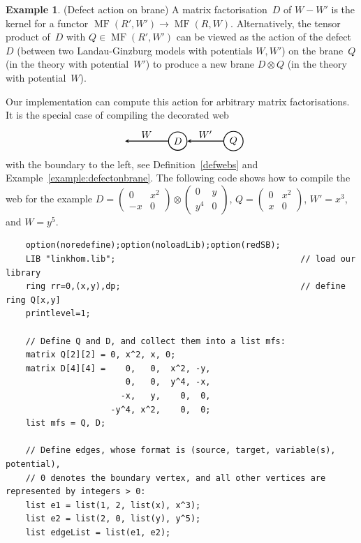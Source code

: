 \documentclass{compositio}
\theoremstyle{definition}
\newtheorem{example}[theorem]{Example}
\numberwithin{equation}{section}
\DeclareMathOperator{\MF}{MF}
\begin{document}
\begin{example}(Defect action on brane) 
A matrix factorisation~$D$ of $W-W'$ is the kernel for a functor $\MF(R',W')\longrightarrow \MF(R,W)$. Alternatively, the tensor product of~$D$ with $Q\in \MF(R',W')$ can be viewed as the action of the defect~$D$ (between two Landau-Ginzburg models with potentials $W,W'$) on the brane~$Q$ (in the theory with potential~$W'$) to produce a new brane $D\otimes Q$ (in the theory with potential~$W$). 

Our implementation can compute this action for arbitrary matrix factorisations. It is the special case of compiling the decorated web
$$
\begin{tikzpicture}[scale=1.0,baseline=-0.1cm, inner sep=1mm, >=stealth]
\node (b) at (-2,0)  {};
\node (D) at (0,0) [circle,draw=black,fill= white, thick] {$D$};
\node (Q) at (2,0) [circle,draw=black,fill= white, thick] {$Q$};
\draw[->,  thick] (Q) -- (D) node[midway,above] {$W'$}; 
\draw[->,  thick] (D) -- (b) node[midway,above] {$W$}; 
\end{tikzpicture} 
$$
with the boundary to the left, see Definition~\ref{defwebs} and Example~\ref{example:defectonbrane}. The following code shows how to compile the web for the example $D=(\begin{smallmatrix} 0& x^2 \\ -x & 0\end{smallmatrix}) \otimes (\begin{smallmatrix} 0& y \\ y^4 & 0\end{smallmatrix})$, $Q=(\begin{smallmatrix} 0& x^2 \\ x & 0\end{smallmatrix})$, $W'=x^3$, and $W=y^5$.
{\footnotesize
\begin{verbatim}
    option(noredefine);option(noloadLib);option(redSB);
    LIB "linkhom.lib";                                     // load our library
    ring rr=0,(x,y),dp;                                    // define ring Q[x,y]
    printlevel=1;

    // Define Q and D, and collect them into a list mfs:
    matrix Q[2][2] = 0, x^2, x, 0;
    matrix D[4][4] =    0,   0,  x^2, -y,
                        0,   0,  y^4, -x,
                       -x,   y,    0,  0,
                     -y^4, x^2,    0,  0;
    list mfs = Q, D;
    
    // Define edges, whose format is (source, target, variable(s), potential), 
    // 0 denotes the boundary vertex, and all other vertices are represented by integers > 0:
    list e1 = list(1, 2, list(x), x^3);
    list e2 = list(2, 0, list(y), y^5);
    list edgeList = list(e1, e2);
    

\end{verbatim}}
\end{example}
\end{document}
